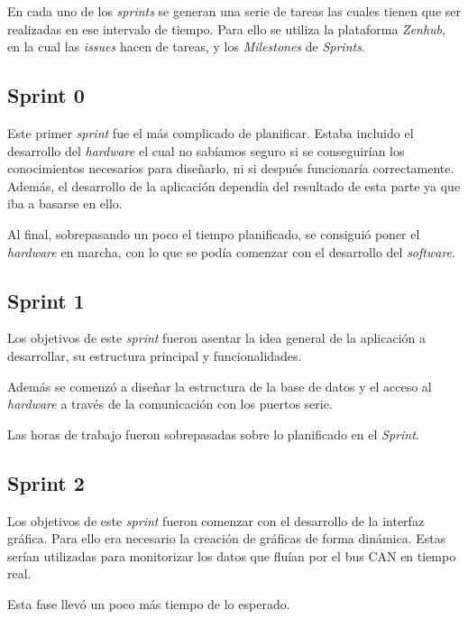 En cada uno de los \emph{sprints} se generan una serie de tareas las cuales tienen que ser realizadas en ese intervalo de tiempo. Para ello se utiliza la plataforma \emph{Zenhub}\cite{zen:hub}, en la cual las \emph{issues} hacen de tareas, y los \emph{Milestones} de \emph{Sprints}.

\subsection{Sprint 0}

Este primer \emph{sprint} fue el más complicado de planificar. Estaba incluido el desarrollo del \emph{hardware} el cual no sabíamos seguro si se conseguirían los conocimientos necesarios para diseñarlo, ni si después funcionaría correctamente. Además, el desarrollo de la aplicación dependía del resultado de esta parte ya que iba a basarse en ello.

Al final, sobrepasando un poco el tiempo planificado, se consiguió poner el \emph{hardware} en marcha, con lo que se podía comenzar con el desarrollo del \emph{software}.


\subsection{Sprint 1}

Los objetivos de este \emph{sprint} fueron asentar la idea general de la aplicación a desarrollar, su estructura principal y funcionalidades.

Además se comenzó a diseñar la estructura de la base de datos y el acceso al \emph{hardware} a través de la comunicación con los puertos serie.

Las horas de trabajo fueron sobrepasadas sobre lo planificado en el \emph{Sprint}.


\subsection{Sprint 2}

Los objetivos de este \emph{sprint} fueron comenzar con el desarrollo de la interfaz gráfica. Para ello era necesario la creación de gráficas de forma dinámica. Estas serían utilizadas para monitorizar los datos que fluían por el bus CAN en tiempo real.

Esta fase llevó un poco más tiempo de lo esperado.


